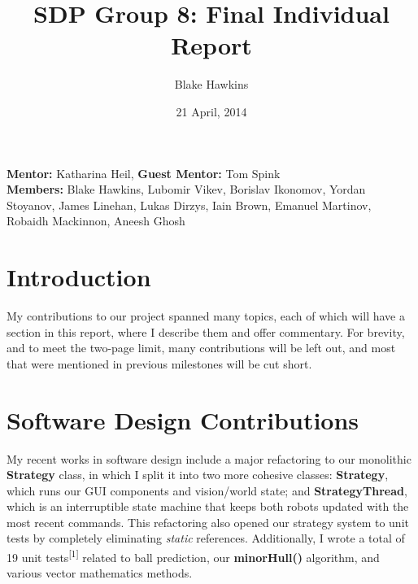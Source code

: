 \documentclass[a4paper,11pt]{article}
\title{SDP Group 8: Final Individual Report} %
\author{Blake Hawkins} %
\date{21 April, 2014} %
\begin{document}
\maketitle %

\begin{center}
\textbf{Mentor:} Katharina Heil, \textbf{Guest Mentor:} Tom Spink %
\\
\textbf{Members:} Blake Hawkins, %
Lubomir Vikev,
Borislav Ikonomov,
Yordan Stoyanov,
James Linehan,
Lukas Dirzys,
Iain Brown,
Emanuel Martinov,
Robaidh Mackinnon,
Aneesh Ghosh

\end{center}


\section{Introduction}

My contributions to our project spanned many topics, each of which will have a section in this report, where I describe them and offer commentary. For brevity, and to meet the two-page limit, many contributions will be left out, and most that were mentioned in previous milestones will be cut short.


\section{Software Design Contributions}

My recent works in software design include a major refactoring to our monolithic \textbf{Strategy} class, in which I split it into two more cohesive classes: \textbf{Strategy}, which runs our GUI components and vision/world state; and \textbf{StrategyThread}, which is an interruptible state machine that keeps both robots updated with the most recent commands. This refactoring also opened our strategy system to unit tests by completely eliminating \textit{static} references. Additionally, I wrote a total of 19 unit tests\textsuperscript{[1]} related to ball prediction, our \textbf{minorHull()} algorithm, and various vector mathematics methods.
\end{document}

